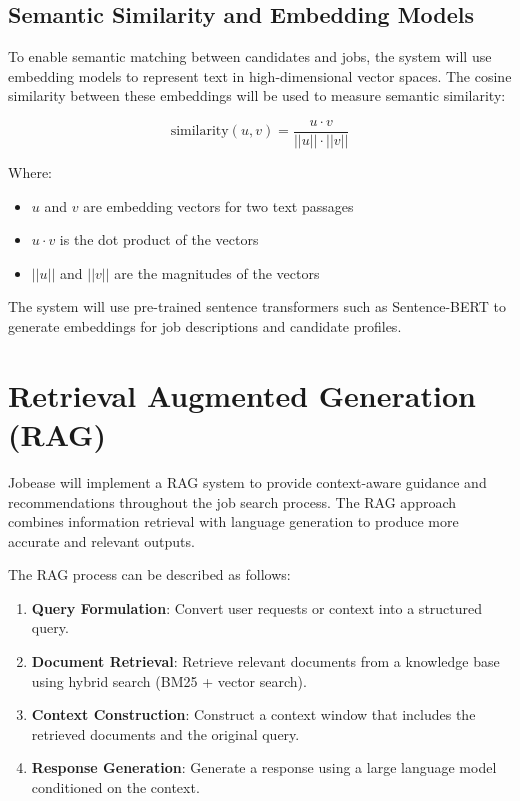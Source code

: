 \documentclass[12pt,a4paper]{report}
\begin{document}
\subsection*{Semantic Similarity and Embedding Models}

To enable semantic matching between candidates and jobs, the system will use embedding models to represent text in high-dimensional vector spaces. The cosine similarity between these embeddings will be used to measure semantic similarity:

\begin{equation}
    \text{similarity}(u, v) = \frac{u \cdot v}{||u|| \cdot ||v||}
\end{equation}

Where:
\begin{itemize}
    \item $u$ and $v$ are embedding vectors for two text passages
    \item $u \cdot v$ is the dot product of the vectors
    \item $||u||$ and $||v||$ are the magnitudes of the vectors
\end{itemize}

The system will use pre-trained sentence transformers such as Sentence-BERT \cite{reimers2019} to generate embeddings for job descriptions and candidate profiles.

\section*{Retrieval Augmented Generation (RAG)}

Jobease will implement a RAG system to provide context-aware guidance and recommendations throughout the job search process. The RAG approach combines information retrieval with language generation to produce more accurate and relevant outputs.

The RAG process can be described as follows:

\begin{enumerate}
    \item \textbf{Query Formulation}: Convert user requests or context into a structured query.
    \item \textbf{Document Retrieval}: Retrieve relevant documents from a knowledge base using hybrid search (BM25 + vector search).
    \item \textbf{Context Construction}: Construct a context window that includes the retrieved documents and the original query.
    \item \textbf{Response Generation}: Generate a response using a large language model conditioned on the context.
\end{enumerate}
\end{document}
